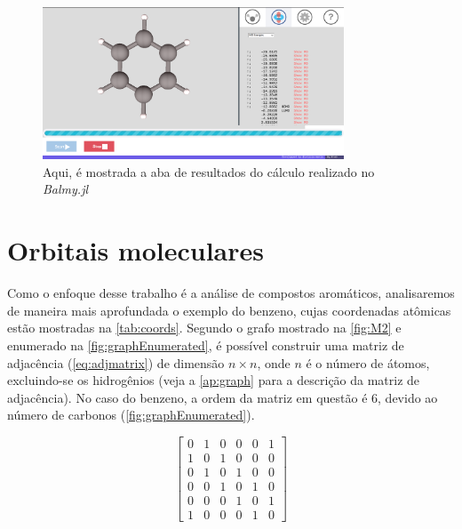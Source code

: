 \begin{figure}[htb]
	\caption{\label{fig:results} Aqui, é mostrada a aba de resultados do cálculo realizado no \textit{Balmy.jl}}
	\begin{center}
		\includegraphics[width=0.8\textwidth]{images/results.png}
	\end{center}
\end{figure}

\section{Orbitais moleculares}\label{sec:benzene}

Como o enfoque desse trabalho é a análise de compostos aromáticos, analisaremos de maneira mais aprofundada o exemplo do benzeno, cujas coordenadas atômicas estão mostradas na \autoref{tab:coords}. Segundo o grafo mostrado na \autoref{fig:M2} e enumerado na \autoref{fig:graphEnumerated}, é possível construir uma matriz de adjacência (\autoref{eq:adjmatrix}) de dimensão $n \times n$, onde $n$ é o número de átomos, excluindo-se os hidrogênios (veja a \autoref{ap:graph} para a descrição da matriz de adjacência). No caso do benzeno, a ordem da matriz em questão é 6, devido ao número de carbonos (\autoref{fig:graphEnumerated}).

\begin{figure}[htb]
\vspace{0.8\baselineskip}
\begin{equation}
\label{eq:adjmatrix}
\begin{bmatrix}
    0 & 1 & 0 & 0 & 0 & 1 \\
    1 & 0 & 1 & 0 & 0 & 0 \\
    0 & 1 & 0 & 1 & 0 & 0 \\
    0 & 0 & 1 & 0 & 1 & 0 \\
    0 & 0 & 0 & 1 & 0 & 1 \\
    1 & 0 & 0 & 0 & 1 & 0
\end{bmatrix}
\end{equation}
\end{figure}

